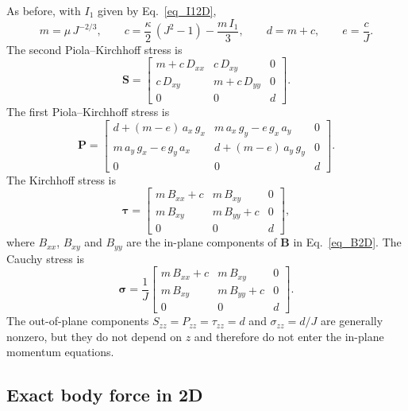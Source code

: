 \documentclass[11pt,a4paper]{article}
\begin{document}
As before, with $I_1$ given by Eq.~\eqref{eq_I12D},
%
\begin{equation}
m=\mu\,J^{-2/3},
\qquad
c=\dfrac{\kappa}{2}\,(J^2-1)-\dfrac{m\,I_1}{3},
\qquad
d=m+c,
\qquad
e=\dfrac{c}{J}.
\end{equation}
%
The second Piola--Kirchhoff stress is
%
\begin{equation}
\boxed{
\textbf{S}=\begin{bmatrix}
m+c\,D_{xx}&c\,D_{xy}&0\\
c\,D_{xy}&m+c\,D_{yy}&0\\
0&0&d
\end{bmatrix}
}.
\label{eq_S2D}
\end{equation}
%
The first Piola--Kirchhoff stress is
%
\begin{equation}
\boxed{
\textbf{P}=\begin{bmatrix}
d+(m-e)\,a_x\,g_x&m\, a_x\,g_y-e\, g_x\,a_y&0\\
m\, a_y\,g_x-e\, g_y\,a_x&d+(m-e)\,a_y\,g_y&0\\
0&0&d
\end{bmatrix}
}.
\label{eq_P2D}
\end{equation}
%
The Kirchhoff stress is
%
\begin{equation}
\boxed{
\boldsymbol{\tau}=\begin{bmatrix}
m\,B_{xx}+c&m\,B_{xy}&0\\
m\,B_{xy}&m\,B_{yy}+c&0\\
0&0&d
\end{bmatrix}
},
\label{eq_tau2D}
\end{equation}
%
where $B_{xx}$, $B_{xy}$ and $B_{yy}$ are the in-plane components of $\textbf{B}$ in Eq.~\eqref{eq_B2D}. The Cauchy stress is
%
\begin{equation}
\boxed{
\boldsymbol{\sigma}=\dfrac1J
\begin{bmatrix}
m\,B_{xx}+c&m\,B_{xy}&0\\
m\,B_{xy}&m\,B_{yy}+c&0\\
0&0&d
\end{bmatrix}
}.
\label{eq_sigma2D}
\end{equation}
%
The out-of-plane components $S_{zz}=P_{zz}=\tau_{zz}=d$ and $\sigma_{zz}=d/J$ are generally nonzero, but they do not depend on $z$ and therefore do not enter the in-plane momentum equations.


\subsection{Exact body force in 2D}
\end{document}
